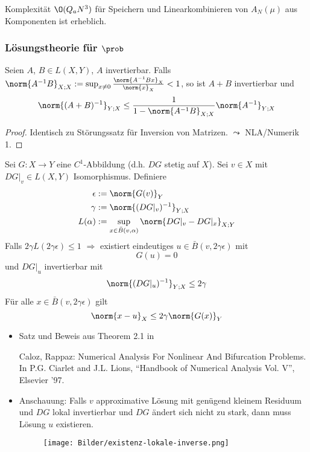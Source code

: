 \begin{bem}
	Komplexität $\O(Q_a N^3)$ für Speichern und Linearkombinieren von $A_N(\mu)$ aus Komponenten ist erheblich.
\end{bem}

\subsubsection*{Lösungstheorie für $\prob$}

\begin{satz} \label{5.3}
	Seien $A$, $B \in L(X,Y)$, $A$ invertierbar.
	Falls $\norm{A^{-1}B}_{X;X} := \sup_{x \neq 0} \frac{\norm{A^{-1}Bx}_X}{\norm{x}_X} < 1$, so ist $A + B$ invertierbar und
	\[
		\norm{(A+B)^{-1}}_{Y;X} \leq \frac{1}{1-\norm{A^{-1}B}_{X;X}} \norm{A^{-1}}_{Y;X}
	\]

	\begin{proof}
		Identisch zu Störungssatz für Inversion von Matrizen. $\leadsto$ NLA/Numerik 1.
	\end{proof}
\end{satz}

\begin{satz} \label{5.4}
	Sei $G: X \to Y$ eine $C^1$-Abbildung (d.h. $DG$ stetig auf $X$).
	Sei $v \in X$ mit $DG|_v \in L(X,Y)$ Isomorphismus.
	Definiere
	\begin{align*}
		\epsilon &:= \norm{G(v)}_Y\\
		\gamma &:= \norm{(DG|_v)^{-1}}_{Y;X}\\
		L(\alpha) &:= \sup_{x \in \bar B(v, \alpha)} \norm{DG|_v - DG|_x}_{X;Y}
	\end{align*}
	Falls $2 \gamma L(2 \gamma \epsilon) \leq 1$ $\Rightarrow$ existiert eindeutiges $u \in \bar B(v,2\gamma\epsilon)$ mit
	\[
		G(u) = 0
	\]
	und $DG|_u$ invertierbar mit
	\[
		\norm{(DG|_u)^{-1}}_{Y;X} \leq 2\gamma
	\]
	Für alle $x \in \bar B(v,2\gamma\epsilon)$ gilt
	\[
		\norm{x-u}_X \leq 2 \gamma \norm{G(x)}_Y
	\]
\end{satz}

\begin{bem} \beginwithlistbem
	\begin{itemize}
		\item Satz und Beweis aus Theorem 2.1 in

			Caloz, Rappaz: Numerical Analysis For Nonlinear And Bifurcation Problems. In P.G. Ciarlet and J.L. Lions, ``Handbook of Numerical Analysis Vol. V'', Elsevier '97.
		\item Anschauung: Falls $v$ approximative Lösung mit genügend kleinem Residuum und $DG$ lokal invertierbar und $DG$ ändert sich nicht zu stark, dann muss Lösung $u$ existieren.
			\begin{figure}[H]
				\centering\small
				\texttt{[image: Bilder/existenz-lokale-inverse.png]}
			\end{figure}
	\end{itemize}
\end{bem}

